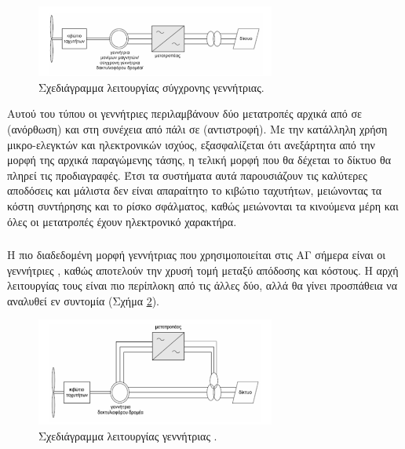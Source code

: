 \documentclass[12pt]{report}
\begin{document}
\begin{figure}[h]
				\center
				\includegraphics[width=0.7\textwidth]{direct-drive}
				\captionsetup{width=0.8\textwidth}
				\caption{Σχεδιάγραμμα λειτουργίας σύγχρονης γεννήτριας.}
				\label{fig:direct-drive}
\end{figure}

Αυτού του τύπου οι γεννήτριες περιλαμβάνουν δύο μετατροπές αρχικά από {} σε {} (ανόρθωση) και στη συνέχεια από {} πάλι σε {} (αντιστροφή). 
Με την κατάλληλη χρήση μικρο-ελεγκτών και ηλεκτρονικών ισχύος, εξασφαλίζεται ότι ανεξάρτητα από την μορφή της αρχικά παραγώμενης τάσης, η τελική μορφή που θα δέχεται το δίκτυο θα πληρεί τις προδιαγραφές.
Έτσι τα συστήματα αυτά παρουσιάζουν τις καλύτερες αποδόσεις και μάλιστα δεν είναι απαραίτητο το κιβώτιο ταχυτήτων, μειώνοντας τα κόστη συντήρησης και το ρίσκο σφάλματος, καθώς μειώνονται τα κινούμενα μέρη και όλες οι μετατροπές
έχουν ηλεκτρονικό χαρακτήρα. 

\subsubsection{{}}
Η πιο διαδεδομένη μορφή γεννήτριας που χρησιμοποιείται στις ΑΓ σήμερα είναι οι γεννήτριες {}, καθώς αποτελούν την χρυσή τομή μεταξύ απόδοσης και κόστους. Η αρχή λειτουργίας τους είναι πιο περίπλοκη από τις άλλες δύο,
αλλά θα γίνει προσπάθεια να αναλυθεί εν συντομία (Σχήμα \ref{fig:dfig}).

\begin{figure}[h]
				\center
				\includegraphics[width=0.7\textwidth]{dfig}
				\captionsetup{width=0.8\textwidth}
				\caption{Σχεδιάγραμμα λειτουργίας γεννήτριας {}.}
				\label{fig:dfig}
\end{figure}
\end{document}
